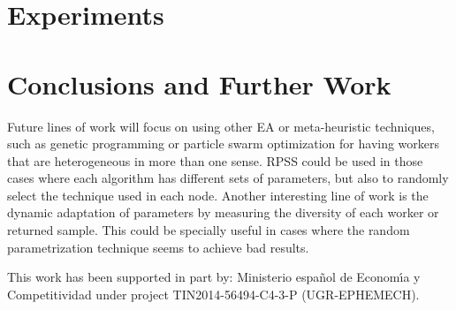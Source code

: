 \section{Experiments}
 \label{sec:experiments}



\section{Conclusions and Further Work}
\label{sec:conclusions}


Future lines of work will focus on using other EA or meta-heuristic techniques, 
such as genetic programming or particle swarm optimization for having 
workers that are heterogeneous in more than one sense. RPSS could be
used in those cases where each algorithm has different sets of
parameters, but also to randomly select the technique used in each
node. Another interesting line of work is the dynamic adaptation of
parameters by measuring the diversity of each worker or returned
sample. This could be specially useful in cases where the random
parametrization technique seems to achieve bad results. 

\begin{acks}
This work has been supported in part by:  Ministerio espa\~{n}ol de
Econom\'{\i}a y Competitividad under project TIN2014-56494-C4-3-P
(UGR-EPHEMECH).
\end{acks}

